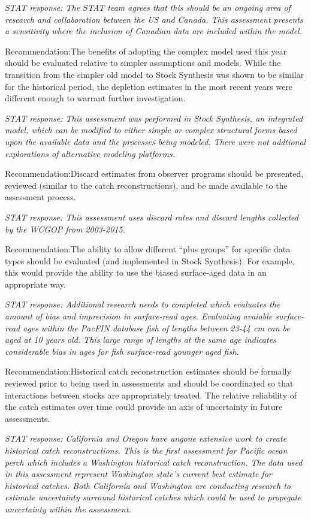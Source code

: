\documentclass[12pt,]{article}
\begin{document}
\emph{STAT response: The STAT team agrees that this should be an ongoing
area of research and collaboration between the US and Canada. This
assessment presents a sensitivity where the inclusion of Canadian data
are included within the model.}

Recommendation:The benefits of adopting the complex model used this year
should be evaluated relative to simpler assumptions and models. While
the transition from the simpler old model to Stock Synthesis was shown
to be similar for the historical period, the depletion estimates in the
most recent years were different enough to warrant further
investigation.

\emph{STAT response: This assessment was performed in Stock Synthesis,
an integrated model, which can be modified to either simple or complex
structural forms based upon the available data and the processes being
modeled. There were not addtional explorations of alternative modeling
platforms.}

Recommendation:Discard estimates from observer programs should be
presented, reviewed (similar to the catch reconstructions), and be made
available to the assessment process.

\emph{STAT response: This assessment uses discard rates and discard
lengths collected by the WCGOP from 2003-2015.}

Recommendation:The ability to allow different ``plus groups'' for
specific data types should be evaluated (and implemented in Stock
Synthesis). For example, this would provide the ability to use the
biased surface-aged data in an appropriate way.

\emph{STAT response: Additional research needs to completed which
evaluates the amount of bias and imprecision in surface-read ages.
Evaluating avaiable surface-read ages within the PacFIN database fish of
lengths between 23-44 cm can be aged at 10 years old. This large range
of lengths at the same age indicates considerable bias in ages for fish
surface-read younger aged fish.}

Recommendation:Historical catch reconstruction estimates should be
formally reviewed prior to being used in assessments and should be
coordinated so that interactions between stocks are appropriately
treated. The relative reliability of the catch estimates over time could
provide an axis of uncertainty in future assessments.

\emph{STAT response: California and Oregon have ungone extensive work to
create historical catch reconstructions. This is the first assessment
for Pacific ocean perch which includes a Washington historical catch
reconstruction. The data used in this assessment represent Washington
state's current best estimate for historical catches. Both California
and Washington are conducting research to estimate uncertainty surround
historical catches which could be used to propegate uncertainty within
the assessment.}
\end{document}
